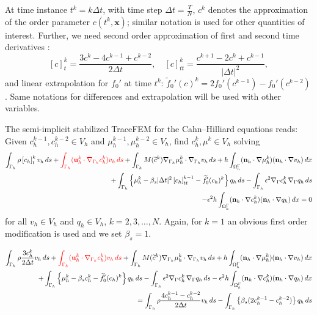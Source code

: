 \documentclass{article}
\newcommand{\bn}{\mathbf n}
\newcommand{\bu}{\mathbf u}
\newcommand{\bx}{\mathbf x}
\newcommand{\gradG}{\nabla_{\Gamma}}
\newcommand{\OGamma}{\Omega^\Gamma_h}
\begin{document}
At time instance $t^k=k\Delta t$, with time step $\Delta t=\frac{T}{N}$,  $c^k$ denotes the approximation of the order parameter $c(t^k, \bx)$;  similar notation is used for other quantities of interest. Further, we need second order approximation of first and second time derivatives :
 \begin{equation}\label{BDF2}
\left[c\right]_t^{k} =\frac{3c^{k}-4c^{k-1}+c^{k-2}}{2\Delta t},\quad
\left[c\right]_{tt}^{k} =\frac{c^{k+1}-2c^{k}+c^{k-1}}{|\Delta t|^2},
\end{equation}
and linear extrapolation for $f_0'$ at time $t^k$: $\widetilde f_0'(c)^k=2f_0'(c^{k-1})- f_0'(c^{k-2})$. Same notations for differences and extrapolation will be used with other variables.

The semi-implicit stabilized TraceFEM for the Cahn--Hilliard equations
reads: Given $c^{k-1}_h,c^{k-2}_h\in V_h$ and $\mu^{k-1}_h,\mu^{k-2}_h\in V_h$,  find $c_h^k, \mu^k \in V_h$ solving
\begin{equation}\label{eq:CH_FE}
\begin{split}
\int_{\Gamma_h} \rho \left[c_h\right]_t^{k}v_h\,ds    + {\color{red}  \int_{\Gamma_h} (\bu_h^k\cdot\nabla_{\Gamma_h}c_h^k )v_h\,ds }+ \int_{\Gamma_h} M(\widetilde c^k) \nabla_{\Gamma_h}\mu_h^k\cdot\nabla_{\Gamma_h}v_h\,ds +  h \int_{\OGamma} (\bn_h\cdot\nabla \mu_h^k) (\bn_h\cdot\nabla v_h) \, dx\\
%
+\int_{\Gamma_h}\left\{  \mu_h^k - \beta_s|\Delta t|^2\left[{c}_h\right]_{tt}^{k-1} - \widetilde  f'_0( c_h)^{k}\right\}q_h\,ds
- \int_{\Gamma_h} \epsilon^2 \gradG c_h^k \, \gradG q_h \, ds \\ -\epsilon^2 h \int_{\OGamma} ( \bn_h\cdot\nabla c_h^k) (\bn_h\cdot\nabla q_h) \, dx = 0
\end{split}
\end{equation}
for all  $v_h\in V_h$ and $q_h \in V_h$, $k=2,3,\dots,N$. Again, for $k=1$ an obvious first order modification is used and we set $\beta_s=1$.

\begin{equation}\label{eq:CH_FE}
	\begin{split}
		\int_{\Gamma_h} \rho \frac{3c_h^k}{2\Delta t}v_h\,ds    + {\color{red}  \int_{\Gamma_h} (\bu_h^k\cdot\nabla_{\Gamma_h}c_h^k )v_h\,ds }+ \int_{\Gamma_h} M(\widetilde c^k) \nabla_{\Gamma_h}\mu_h^k\cdot\nabla_{\Gamma_h}v_h\,ds +  h \int_{\OGamma} (\bn_h\cdot\nabla \mu_h^k) (\bn_h\cdot\nabla v_h) \, dx\\
		+\int_{\Gamma_h}\left\{  \mu_h^k - \beta_s c_h^k - \widetilde  f'_0( c_h)^{k}\right\}q_h\,ds
		- \int_{\Gamma_h} \epsilon^2 \gradG c_h^k \, \gradG q_h \, ds  -\epsilon^2 h \int_{\OGamma} ( \bn_h\cdot\nabla c_h^k) (\bn_h\cdot\nabla q_h) \, dx \\= \int_{\Gamma_h} \rho \frac{4c_h^{k-1}-c_h^{k-2}}{2\Delta t}v_h\,ds - \int_{\Gamma_h}\left\{\beta_s(2c_h^{k-1}-c_h^{k-2})\right\}q_h\,ds
	\end{split}
\end{equation}
\end{document}
